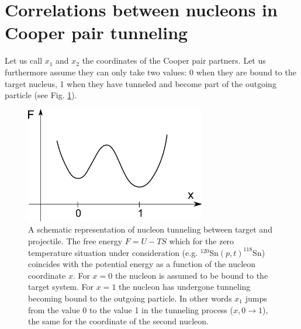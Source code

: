 \section[Correlations in Cooper pair tunneling]{Correlations between nucleons in Cooper pair tunneling}\label{C3S3}
Let us call $x_1$ and $x_2$ the coordinates of the Cooper pair partners. Let us furthermore assume they can only take two values: 0 when they are bound to the target nucleus, 1 when they have tunneled and become part of the outgoing particle (see Fig. \ref{fig3.3.1}).
\begin{figure}
\centerline{\includegraphics*[width=0.7\textwidth,angle=0]{nutshell/figs/fig3_3_1.pdf}}
\caption{A schematic representation of nucleon tunneling between target and projectile. The free energy $F=U-TS$ which for the zero temperature situation under consideration (e.g. $^{120}$Sn$(p,t)^{118}$Sn) coincides with the potential energy as a function of the nucleon coordinate $x$. For $x=0$ the nucleon is assumed to be bound to the target system. For $x=1$ the nucleon has undergone tunneling becoming bound to the outgoing particle. In other words $x_1$ jumps from the value 0 to the value 1 in the tunneling process ($x, 0\rightarrow 1$), the same for the coordinate of the second nucleon.}\label{fig3.3.1}
\end{figure}

